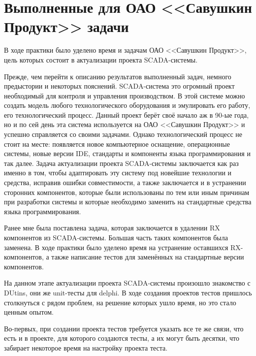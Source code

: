 \sectionbreak \section*{ 
    \gostTitleFont
    \redline
    Выполненные для ОАО <<Савушкин Продукт>> задачи
}

\subtitlespace

{\gostFont

    \par \redline В ходе практики было уделено время и задачам ОАО <<Савушкин Продукт>>, цель которых состоит в актуализации проекта SCADA-системы. 

    \par \redline Прежде, чем перейти к описанию результатов выполненный задач, немного предыстории и некоторых пояснений. SCADA-система это огромный проект необходимый для контроля и управления производством. В этой системе можно создать модель любого технологического оборудования и эмулировать его работу, его технологический процесс. Данный проект берёт своё начало аж в 90-ые года, но и по сей день эта система используется на ОАО <<Савушкин Продукт>> и успешно справляется со своими задачами. Однако технологический процесс не стоит на месте: появляется новое компьютерное оснащение, операционные системы, новые версии IDE, стандарты и компоненты языка программирования и так далее. Задача актуализации проекта SCADA-системы заключается как раз именно в том, чтобы адаптировать эту систему под новейшие технологии и средства, исправив ошибки совместимости, а также заключается и в устранении сторонних компонентов, которые были использованы по тем или иным причинам при разработки системы и которые необходимо заменить на стандартные средства языка программирования.

    \par \redline Ранее мне была поставлена задача, которая заключается в удалении RX компонентов из SCADA-системы. Большая часть таких компонентов была заменена. В ходе практики было уделено время на устранение оставшихся RX-компонентов, а также написание тестов для заменённых на стандартные версии компонентов.

    \par \redline На данном этапе актуализации проекта SCADA-системы произошло знакомство с DUtins, они же unit-тесты для delphi. В ходе создания проектов тестов пришлось столкнуться с рядом проблем, на решение которых ушло время, но это стало ценным опытом.

    \par \redline Во-первых, при создании проекта тестов требуется указать все те же связи, что есть и в проекте, для которого создаются тесты, а их могут быть десятки, что забирает некоторое время на настройку проекта теста. 

}
